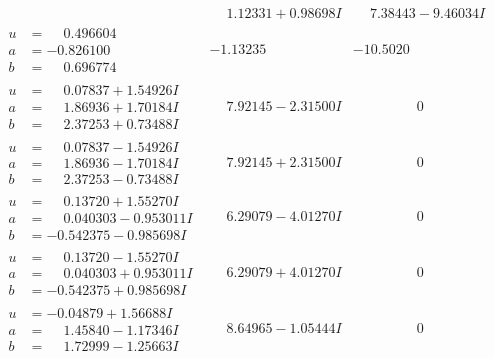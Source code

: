 \documentclass[1p]{elsarticle_modified}
\theoremstyle{definition}
\begin{document}
$$\begin{array}{c|c|c}
 & \phantom{-}1.12331 + 0.98698 I & \phantom{-}7.38443 - 9.46034 I \\ \hline\begin{aligned}
u &= \phantom{-}0.496604\phantom{ +0.000000I} \\
a &= -0.826100\phantom{ +0.000000I} \\
b &= \phantom{-}0.696774\phantom{ +0.000000I}\end{aligned}
 & -1.13235\phantom{ +0.000000I} & -10.5020\phantom{ +0.000000I} \\ \hline\begin{aligned}
u &= \phantom{-}0.07837 + 1.54926 I \\
a &= \phantom{-}1.86936 + 1.70184 I \\
b &= \phantom{-}2.37253 + 0.73488 I\end{aligned}
 & \phantom{-}7.92145 - 2.31500 I & \phantom{-0.000000 } 0 \\ \hline\begin{aligned}
u &= \phantom{-}0.07837 - 1.54926 I \\
a &= \phantom{-}1.86936 - 1.70184 I \\
b &= \phantom{-}2.37253 - 0.73488 I\end{aligned}
 & \phantom{-}7.92145 + 2.31500 I & \phantom{-0.000000 } 0 \\ \hline\begin{aligned}
u &= \phantom{-}0.13720 + 1.55270 I \\
a &= \phantom{-}0.040303 - 0.953011 I \\
b &= -0.542375 - 0.985698 I\end{aligned}
 & \phantom{-}6.29079 - 4.01270 I & \phantom{-0.000000 } 0 \\ \hline\begin{aligned}
u &= \phantom{-}0.13720 - 1.55270 I \\
a &= \phantom{-}0.040303 + 0.953011 I \\
b &= -0.542375 + 0.985698 I\end{aligned}
 & \phantom{-}6.29079 + 4.01270 I & \phantom{-0.000000 } 0 \\ \hline\begin{aligned}
u &= -0.04879 + 1.56688 I \\
a &= \phantom{-}1.45840 - 1.17346 I \\
b &= \phantom{-}1.72999 - 1.25663 I\end{aligned}
 & \phantom{-}8.64965 - 1.05444 I & \phantom{-0.000000 } 0 \\ \hline\begin{aligned}

\end{aligned}
\end{array}$$
\end{document}
